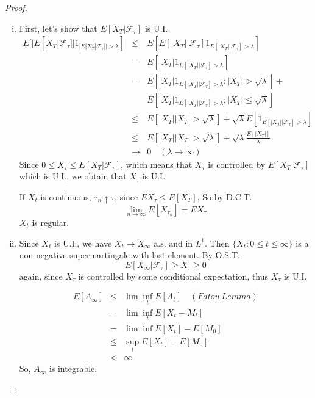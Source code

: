 \documentclass{article}     %
\begin{document}
\begin{proof}
\begin{enumerate}[(i)]
    \item First, let's show that $E[X_T|\mathcal{F}_\tau]$ is U.I.
    \begin{eqnarray*}
        E[|E[X_T|\mathcal{F}_\tau]|1_{|E[X_T|\mathcal{F}_\tau]|>\lambda}] &\leq & E[E[|X_T||\mathcal{F}_\tau]1_{E[|X_T||\mathcal{F}_\tau]>\lambda}]\\
        & = & E[|X_T|1_{E[|X_T||\mathcal{F}_\tau]>\lambda}] \\
        & = & E[|X_T|1_{E[|X_T||\mathcal{F}_\tau]>\lambda};|X_T|>\sqrt{\lambda}]+\\
        &~~~& E[|X_T|1_{E[|X_T||\mathcal{F}_\tau]>\lambda};|X_T|\leq\sqrt{\lambda}]\\ 
        & \leq &  E[|X_T||X_T|>\sqrt{\lambda}]+ \sqrt{\lambda}E[1_{E[|X_T||\mathcal{F}_\tau]>\lambda}]\\ 
        & \leq & E[|X_T||X_T|>\sqrt{\lambda}]+ \sqrt{\lambda}\frac{E[|X_T|]}{\lambda}\\ 
        & \rightarrow & 0 \quad (\lambda \rightarrow \infty)    
    \end{eqnarray*}
    Since  $0\leq X_{\tau}\leq E[X_T|\mathcal{F}_{\tau}]$, which means that $X_{\tau}$ is controlled by $E[X_T|\mathcal{F}_{\tau}]$ which is U.I., we obtain that $X_{\tau}$ is U.I.
    
    If $X_t$ is continuous, $\tau_{n} \uparrow \tau $, since $EX_{\tau}\leq E[X_T]$, So by D.C.T. 
    \[\lim_{n\rightarrow \infty}E[X_{\tau_{n}}]=E{X_{\tau}}\]
    $X_t$ is regular.
   
    \item Since $X_t$ is U.I., we have $X_t\rightarrow X_{\infty}$ a.s. and in $L^1$. Then $\{X_{t}:0\leq t\leq \infty\}$ is a non-negative supermartingale with last element. By O.S.T. \[E[X_{\infty}|\mathcal{F_{\tau}}]\geq X_{\tau}\geq 0\]
    again, since $X_{\tau}$ is controlled by some conditional expectation, thus $X_{\tau}$ is U.I.
    
    \begin{eqnarray*}
        E[A_{\infty}]& \leq& \lim\inf_tE[A_t]\quad (Fatou~Lemma)\\ 
        & = & \lim\inf_{t}E[X_t-M_t]\\
        &=& \lim\inf E[X_t]-E[M_0]\\
        &\leq & \sup_t E[X_t]-E[M_0]\\
        &< & \infty
        \end{eqnarray*}
  So, $A_{\infty}$ is integrable.
    \end{enumerate}

\end{proof}
\end{document}
